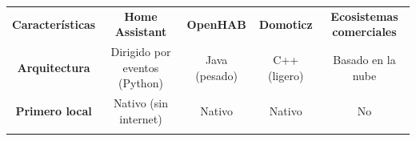 \begin{table}[H]
    \centering
    \setlength{\tabcolsep}{3pt}
    \renewcommand{\arraystretch}{1.2}
    \begin{tabular}{|c|c|c|c|c|}
        \hhline{|-|-|-|-|-|}
        \rowcolor[gray]{0.9} 
        \parbox[c]{4.5cm}{\vspace{0.2cm}\centering\textbf{Características}\vspace{0.2cm}} & \parbox[c]{2.4cm}{\vspace{0.2cm}\centering\textbf{Home Assistant}\vspace{0.2cm}} & \parbox[c]{2.2cm}{\vspace{0.2cm}\centering\textbf{OpenHAB}\vspace{0.2cm}} & \parbox[c]{2.1cm}{\vspace{0.2cm}\centering\textbf{Domoticz}\vspace{0.2cm}} & \parbox[c]{2.5cm}{\vspace{0.2cm}\centering\textbf{Ecosistemas comerciales}\vspace{0.2cm}} \\ \hhline{|-|-|-|-|-|}
        \parbox[c]{4.5cm}{\vspace{0.2cm}\centering\textbf{Arquitectura}\vspace{0.2cm}} & \parbox[c]{2.4cm}{\vspace{0.2cm}\centering Dirigido por eventos (Python)\vspace{0.2cm}} & \parbox[c]{2.2cm}{\vspace{0.2cm}\centering Java (pesado)\vspace{0.2cm}} & \parbox[c]{2.1cm}{\vspace{0.2cm}\centering C++ (ligero)\vspace{0.2cm}} & \parbox[c]{2.5cm}{\vspace{0.2cm}\centering Basado en la nube\vspace{0.2cm}} \\ \hhline{|-|-|-|-|-|}
        \parbox[c]{4.5cm}{\vspace{0.2cm}\centering\textbf{Primero local}\vspace{0.2cm}} & \parbox[c]{2.4cm}{\vspace{0.2cm}\centering Nativo (sin internet)\vspace{0.2cm}} & \parbox[c]{2.2cm}{\vspace{0.2cm}\centering Nativo\vspace{0.2cm}} & \parbox[c]{2.1cm}{\vspace{0.2cm}\centering Nativo\vspace{0.2cm}} & \parbox[c]{2.5cm}{\vspace{0.2cm}\centering No\vspace{0.2cm}} \\ \hhline{|-|-|-|-|-|}

\end{tabular}
\end{table}
